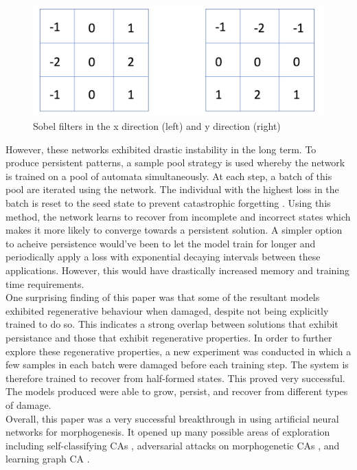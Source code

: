 \begin{figure}[!h]
    \centering
    \includegraphics[width=5in]{images/sobel.png}
    \caption{Sobel filters in the x direction (left) and y direction (right) \cite{sodha}}
    \label{fig:sobel}
\end{figure}

However, these networks exhibited drastic instability in the long term.
To produce persistent patterns, a sample pool strategy is used whereby the network is trained on a pool of automata simultaneously.
At each step, a batch of this pool are iterated using the network.
The individual with the highest loss in the batch is reset to the seed state to prevent catastrophic forgetting \cite{mccloskey1989catastrophic}. 
Using this method, the network learns to recover from incomplete and incorrect states which makes it more likely to converge towards a persistent solution.
A simpler option to acheive persistence would've been to let the model train for longer and periodically apply a loss with exponential decaying intervals between these applications.
However, this would have drastically increased memory and training time requirements.\\

One surprising finding of this paper was that some of the resultant models exhibited regenerative behaviour when damaged, despite not being explicitly trained to do so. 
This indicates a strong overlap between solutions that exhibit persistance and those that exhibit regenerative properties. 
In order to further explore these regenerative properties, a new experiment was conducted in which a few samples in each batch were damaged before each training step. 
The system is therefore trained to recover from half-formed states.
This proved very successful. The models produced were able to grow, persist, and recover from different types of damage.\\

Overall, this paper was a very successful breakthrough in using artificial neural networks for morphogenesis. It opened up many possible areas of exploration including self-classifying CAs \cite{randazzo2020self-classifying}, adversarial attacks on morphogenetic CAs \cite{randazzo2021adversarial}, and learning graph CA \cite{grattarola2021learning}.

